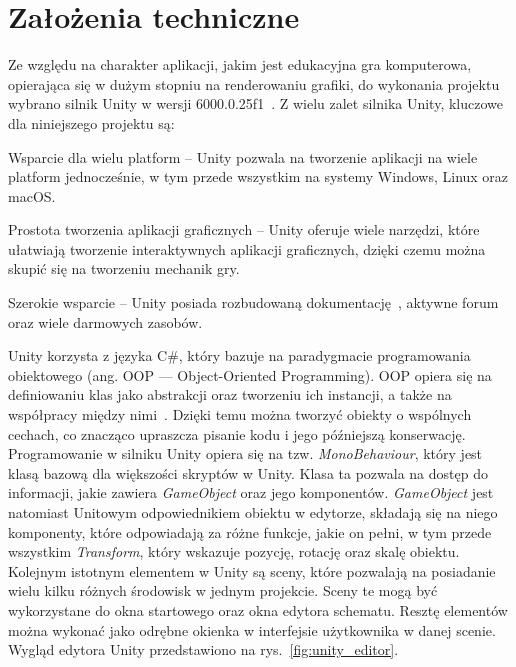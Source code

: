 \section{Założenia techniczne}
\label{sec:zalozenia_techniczne}

Ze względu na charakter aplikacji, jakim jest edukacyjna gra komputerowa,
opierająca się w dużym stopniu na renderowaniu grafiki,
do wykonania projektu wybrano silnik Unity w wersji 6000.0.25f1~\cite{unity_site}.
Z wielu zalet silnika Unity, kluczowe dla niniejszego projektu są:

\begin{citemize}
    \item Wsparcie dla wielu platform --
    Unity pozwala na tworzenie aplikacji na wiele platform jednocześnie, w tym przede wszystkim na systemy Windows, Linux oraz macOS.
    \item Prostota tworzenia aplikacji graficznych --
    Unity oferuje wiele narzędzi, które ułatwiają tworzenie interaktywnych aplikacji graficznych,
    dzięki czemu można skupić się na tworzeniu mechanik gry.
    \item Szerokie wsparcie --
    Unity posiada rozbudowaną dokumentację~\cite{unity_docs},
    aktywne forum~\cite{unity_forum} oraz wiele darmowych zasobów.
\end{citemize}


Unity korzysta z języka C\#,
który bazuje na paradygmacie programowania obiektowego (ang. OOP — Object-Oriented Programming).
OOP opiera się na definiowaniu klas jako abstrakcji oraz tworzeniu ich instancji,
a także na współpracy między nimi~\cite{nygaard1986basic}.
Dzięki temu można tworzyć obiekty o wspólnych cechach,
co znacząco upraszcza pisanie kodu i jego późniejszą konserwację.\\
\indent Programowanie w silniku Unity opiera się na tzw. \textit{MonoBehaviour},
który jest klasą bazową dla większości skryptów w Unity.
Klasa ta pozwala na dostęp do informacji, jakie zawiera \textit{GameObject} oraz jego komponentów.
\textit{GameObject} jest natomiast Unitowym odpowiednikiem obiektu w edytorze,
składają się na niego komponenty, które odpowiadają za różne funkcje, jakie on pełni,
w tym przede wszystkim \textit{Transform}, który wskazuje pozycję, rotację oraz skalę obiektu.\\
\indent Kolejnym istotnym elementem w Unity są sceny,
które pozwalają na posiadanie wielu kilku różnych środowisk w jednym projekcie.
Sceny te mogą być wykorzystane do okna startowego oraz okna edytora schematu.
Resztę elementów można wykonać jako odrębne okienka w interfejsie użytkownika w danej scenie.
Wygląd edytora Unity przedstawiono na rys.~\ref{fig:unity_editor}.

